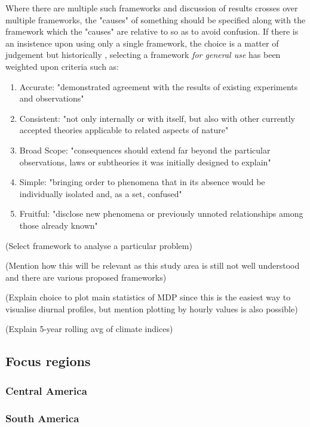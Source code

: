 Where there are multiple such frameworks and discussion of results crosses over multiple frameworks, the "causes" of something should be specified along with the framework which the "causes" are relative to so as to avoid confusion. If there is an insistence upon using only a single framework, the choice is a matter of judgement but historically \citep{kuhn1970}, selecting a framework \textit{for general use} has been weighted upon criteria such as: 
\begin{enumerate}
	\item Accurate: "demonstrated agreement with the results of existing experiments and observations" \citep{kuhn1977}
	\item Consistent: "not only internally or with itself, but also with other currently accepted theories applicable to related aspects of nature" \citep{kuhn1977}
	\item Broad Scope: "consequences should extend far beyond the particular observations, laws or subtheories it was initially designed to explain" \citep{kuhn1977}
	\item Simple: "bringing order to phenomena that in its absence would be individually isolated and, as a set, confused" \citep{kuhn1977}
	\item Fruitful: "disclose new phenomena or previously unnoted relationships among those already known" \citep{kuhn1977}
\end{enumerate}



(Select framework to analyse a particular problem)

(Mention how this will be relevant as this study area is still not well understood and there are various proposed frameworks)

(Explain choice to plot main statistics of MDP since this is the easiest way to visualise diurnal profiles, but mention plotting by hourly values is also possible)

(Explain 5-year rolling avg of climate indices)

\subsection{Focus regions}

\subsubsection{Central America}

\subsubsection{South America}


